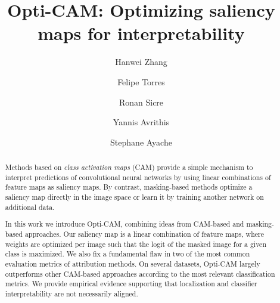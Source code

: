 \documentclass[preprint,3p,10pt]{elsarticle}
\begin{document}




\newcommand{\ronan}[1]{#1}
\newcommand{\iavr}[1]{#1}
\newcommand{\stephane}[1]{#1}
\newcommand{\redred}[1]{#1}
\newcommand{\hw}[1]{{\color{olive}{#1}}}


\begin{frontmatter}
\title{Opti-CAM: Optimizing saliency maps for interpretability}


\author[1]{Hanwei Zhang}
\author[1]{Felipe Torres}
\author[1]{Ronan Sicre}
\author[2]{Yannis Avrithis}
\author[1]{Stephane Ayache}






\begin{abstract}
Methods based on \emph{class activation maps} (CAM) provide a simple mechanism to interpret predictions of convolutional neural networks by using linear combinations of feature maps as saliency maps. By contrast, masking-based methods optimize a saliency map directly in the image space or learn it by training another network on additional data.

In this work we introduce Opti-CAM, combining ideas from CAM-based and masking-based approaches. Our saliency map is a linear combination of feature maps, where weights are optimized per image such that the logit of the masked image for a given class is maximized. We also fix a fundamental flaw in two of the most common evaluation metrics of attribution methods. On several datasets, Opti-CAM largely outperforms other CAM-based approaches according to the most relevant classification metrics. We provide empirical evidence supporting that localization and classifier interpretability are not necessarily aligned.
\end{abstract}


\end{frontmatter}
\end{document}
